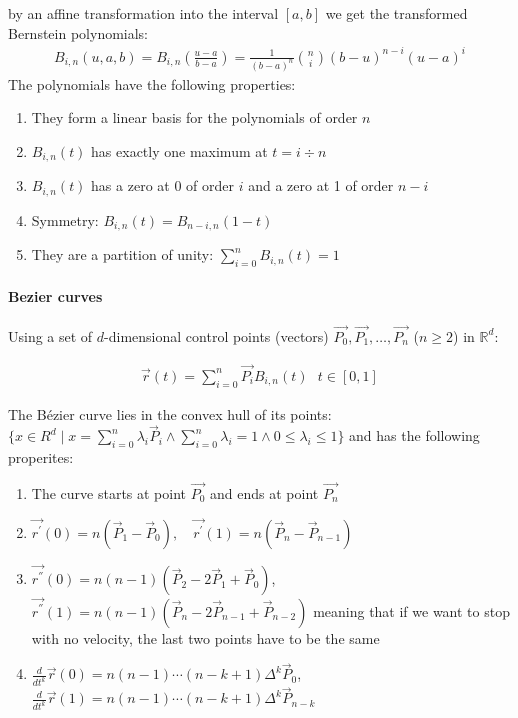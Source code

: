 by an affine transformation into the interval $[a,b]$ we get the transformed Bernstein polynomials:
\begin{align*}
	B_{i,n}(u,a,b) = B_{i,n}\left(\frac{u-a}{b-a}\right)
	= \frac{1}{(b-a)^n}\binom{n}{i}(b-u)^{n-i}(u-a)^i
\end{align*}
The polynomials have the following properties:
\begin{enumerate}
	\item They form a linear basis for the polynomials of order $n$
	\item $B_{i,n}(t)$ has exactly one maximum at $t = i\div n$
	\item $B_{i,n}(t)$ has a zero at 0 of order $i$ and a zero at 1 of order $n-i$
	\item Symmetry: $B_{i,n}(t) = B_{n-i,n}(1 - t)$
	\item They are a partition of unity: $\sum_{i=0}^n B_{i,n}(t) = 1$
\end{enumerate}

\paragraph{Bezier curves}
Using a set of $d$-dimensional control points (vectors) $\vec{P_0}, \vec{P_1}, \ldots, \vec{P_n}$ ($n\geq 2$) in $\mathbb{R}^d$:
\begin{snugshade*}
	\begin{align*}
		\vec{r}(t) = \sum_{i=0}^n \vec{P_i}B_{i,n}(t)\ \ \ t\in[0,1]
	\end{align*}
\end{snugshade*}
The B\'ezier curve lies in the convex hull of its points:
$\{x\in R^{d}\mid x=\sum_{i=0}^{n}\lambda_{i}{\vec{P}}_{i}\wedge\sum_{i=0}^{n}\lambda_{i}=1\wedge 0\leq\lambda_{i}\leq1\}$
and has the following properites:
\begin{enumerate}
	\item The curve starts at point $\vec{P_0}$ and ends at point $\vec{P_n}$
	\item $\vec{r^{\prime}}(0) = n(\vec{P}_{1}-\vec{P}_{0}), \quad\vec{r^{\prime}}(1)=n(\vec{P}_{n}-\vec{P}_{n-1})$
	\item{
		$\vec{r^{''}}(0) = n(n-1)(\vec{P}_{2}-2\vec{P}_{1}+\vec{P}_{0})$,
		$\vec{r^{''}}(1)=n(n-1)(\vec{P}_{n}-2\vec{P}_{n-1}+\vec{P}_{n-2})$
		meaning that if we want to stop with no velocity, the last two points have to be the same
	}
	\item{
		$\frac{d}{d t^{k}}\vec{r}(0) = n(n-1)\cdots(n-k+1)\Delta^{k}\vec{P}_{0}$,
		$\frac{d}{d t^{k}}\vec{r}(1)=n(n-1)\cdots(n-k+1)\Delta^{k}\vec{P}_{n-k}$
	}
\end{enumerate}

